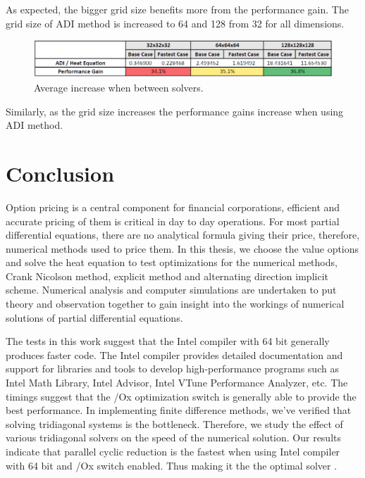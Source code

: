 \documentclass[12pt, oneside]{book}
\theoremstyle{plain}
\theoremstyle{definition}
\begin{document}
As expected, the bigger grid size benefits more from the performance gain. The grid size of ADI method is increased to 64 and 128 from 32 for all dimensions.

 \begin{figure}[!htb]
    \centering
        \includegraphics[scale=0.7]{gridTimeADI.png}
    \caption{Average increase when between solvers.}
\end{figure}

Similarly, as the grid size increases the performance gains increase when using ADI method.
\chapter{Conclusion}

Option pricing is a central component for financial corporations, efficient and accurate pricing of them is critical in day to day operations. For  most  partial differential equations, there are no analytical formula giving their price, therefore, numerical methods used to price them. In this thesis, we choose the value options and solve the heat equation to test optimizations for the numerical methods, Crank Nicolson method, explicit method and alternating direction implicit scheme. Numerical analysis and computer simulations are undertaken to put theory and observation together to gain insight into the workings of numerical solutions of partial differential equations. 

The tests in this work suggest that the Intel compiler with 64 bit generally produces faster code. The Intel compiler provides detailed documentation and support for libraries and tools to develop high-performance programs such as Intel Math Library, Intel Advisor, Intel VTune Performance Analyzer, etc. The timings suggest that the /Ox optimization switch is generally able to provide the best performance. In implementing finite difference methods, we’ve verified that solving tridiagonal systems is the bottleneck. Therefore, we study the effect of various tridiagonal solvers on the speed of the numerical solution. 
Our results indicate that parallel cyclic reduction is the fastest when using Intel compiler with 64 bit and /Ox switch enabled. Thus making it the the optimal solver . 
\end{document}
